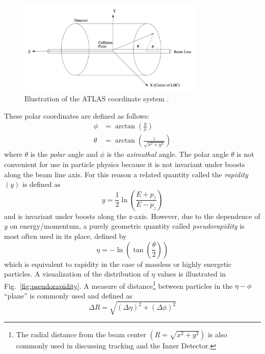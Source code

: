 \begin{figure}
	\centering
	\includegraphics[width=0.8\textwidth]{atlas_coordinate_system}
	\caption{ Illustration of the ATLAS coordinate system \cite{Schott_2014}. }
	\label{fig:atlas_coordinate_system}
\end{figure}

These polar coordinates are defined as follows:
\begin{align}
\phi &= \arctan\left( {\frac{y}{x}} \right) \\
\theta &= \arctan \left( {\frac{z}{\sqrt{x^2+y^2}}} \right)
\label{eqn:polar_coordinates}
\end{align}
where $\theta$ is the \textit{polar} angle and $\phi$ is the \textit{azimuthal} angle.
The polar angle $\theta$ is not convenient for use in particle physics because it is not invariant under boosts along the beam line axis. For this reason a related quantity called the \textit{rapidity} $(y)$ is defined as
\begin{equation}
y = \frac{1}{2} \ln \left( \frac{E + p_z}{E-p_z} \right)
\label{eqn:rapidity}
\end{equation}
and is invariant under boosts along the z-axis. However, due to the dependence of $y$ on energy/momentum, a purely geometric quantity called \textit{pseudorapidity} is most often used in its place, defined by
\begin{equation}
\eta = -\ln \left(\tan\left( \frac{\theta}{2} \right) \right)
\label{eqn:pseudorapidity}
\end{equation}
which is equivalent to rapidity in the case of massless or highly energetic particles.
A visualization of the distribution of $\eta$ values is illustrated in Fig.~\ref{fig:pseudorapidity}.
A measure of distance\footnote{The radial distance from the beam center $\left(R = \sqrt{x^2 + y^2}\right)$ is also commonly used in discussing tracking and the Inner Detector.} between particles in the $\eta-\phi$ ``plane'' is commonly used and defined as
\begin{equation}
\Delta R = \sqrt{(\Delta \eta)^2 + (\Delta \phi)^2}
\label{eqn:deltaR}
\end{equation}

